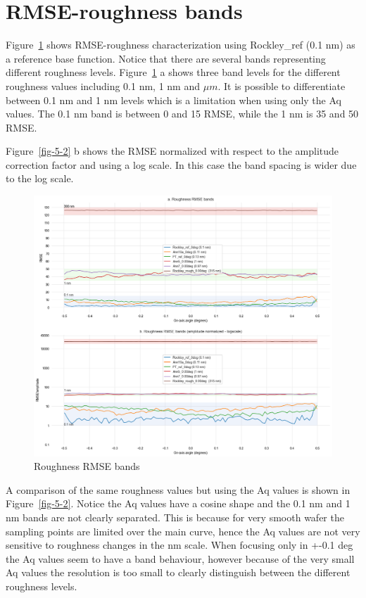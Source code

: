 \documentclass[
  letterpaper,
  DIV=11,
  numbers=noendperiod,
  oneside]{scrreprt}
\begin{document}
\hypertarget{rmse-roughness-bands}{%
\section{RMSE-roughness bands}\label{rmse-roughness-bands}}

Figure~\ref{fig-5-1} shows RMSE-roughness characterization using
Rockley\_ref (0.1 nm) as a reference base function. Notice that there
are several bands representing different roughness levels.
Figure~\ref{fig-5-1} a shows three band levels for the different
roughness values including 0.1 nm, 1 nm and \(\mu m\). It is possible to
differentiate between 0.1 nm and 1 nm levels which is a limitation when
using only the Aq values. The 0.1 nm band is between 0 and 15 RMSE,
while the 1 nm is 35 and 50 RMSE.

Figure~\ref{fig-5-2} b shows the RMSE normalized with respect to the
amplitude correction factor and using a log scale. In this case the band
spacing is wider due to the log scale.

\begin{figure}

{\centering \includegraphics{notebooks/d_RMSE_files/figure-pdf/fig-5-1-output-1.png}

}

\caption{\label{fig-5-1}Roughness RMSE bands}

\end{figure}

A comparison of the same roughness values but using the Aq values is
shown in Figure~\ref{fig-5-2}. Notice the Aq values have a cosine shape
and the 0.1 nm and 1 nm bands are not clearly separated. This is because
for very smooth wafer the sampling points are limited over the main
curve, hence the Aq values are not very sensitive to roughness changes
in the nm scale. When focusing only in +-0.1 deg the Aq values seem to
have a band behaviour, however because of the very small Aq values the
resolution is too small to clearly distinguish between the different
roughness levels.
\end{document}
